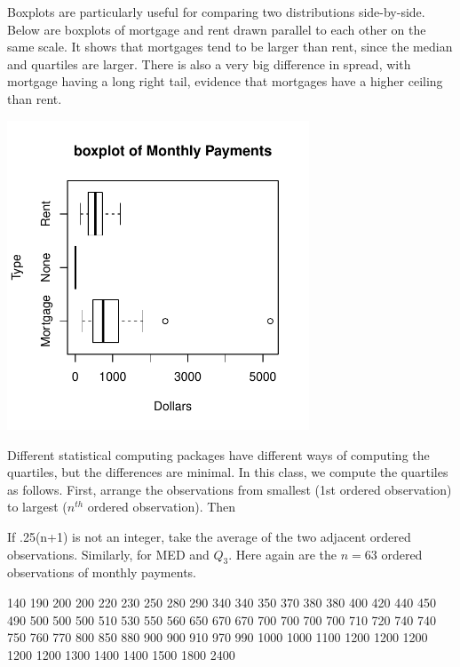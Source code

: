 \documentclass[11pt, chapterprefix=true]{scrbook}\usepackage[]{graphicx}\usepackage[]{color}
\begin{document}
Boxplots are particularly useful for comparing two distributions side-by-side.  Below are boxplots of mortgage and rent drawn parallel to each other on the same scale.  It shows that mortgages tend to be larger than rent, since the median and quartiles are larger.  There is also a very big difference in spread, with mortgage having a long right tail, evidence that mortgages have a higher ceiling than rent.



{\centering \includegraphics[width=9cm]{figure/LBL2h-1} 

}




Different statistical computing packages have different ways of computing the quartiles, but the differences are minimal.  In this class, we compute the quartiles as follows.  First, arrange the observations from smallest (1st ordered observation) to largest ($n^{th}$ ordered observation).  Then


If .25(n+1) is not an integer, take the average of the two adjacent ordered observations.  Similarly, for MED and $Q_3$.  Here again are the $n = 63$ ordered observations of monthly payments.

{\small{
140  190  200  200  220  230  250  280  290  340  340  350  370  380  380
      400  420  440  450  490  500  500  500  510  530  550  560  650  670  670
      700  700  700  700  710  720  740  740  750  760  770  800  850  880  900
      900  910  970  990 1000 1000 1100 1200 1200 1200 1200 1200 1300 1400 1400
     1500 1800 2400
}}
\end{document}
